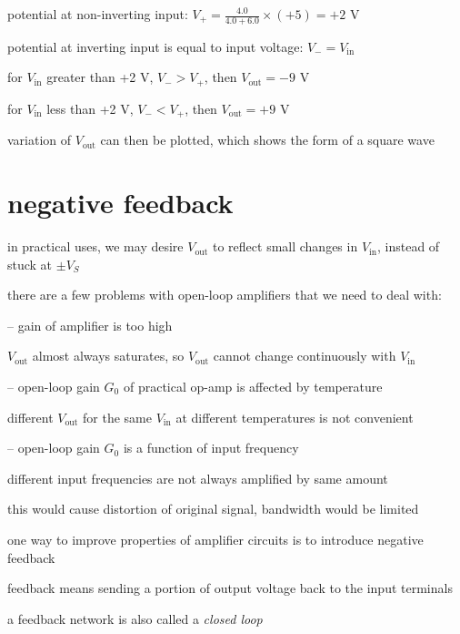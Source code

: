 \sol potential at non-inverting input: $V_+ = \frac{4.0}{4.0+6.0}\times(+5) = +2\text{ V}$

potential at inverting input is equal to input voltage: $V_-=V_\text{in}$

for $V_\text{in}$ greater than +2 V, $V_->V_+$, then $V_\text{out}=-9\text{ V}$

for $V_\text{in}$ less than +2 V, $V_-<V_+$, then $V_\text{out}=+9\text{ V}$

variation of $V_\text{out}$ can then be plotted, which shows the form of a square wave \eoe

\section{negative feedback}

in practical uses, we may desire $V_\text{out}$ to reflect small changes in $V_\text{in}$, instead of stuck at $\pm V_S$

there are a few problems with open-loop amplifiers that we need to deal with:

\begin{compactitem}
	\item[--] gain of amplifier is too high
	
	$V_\text{out}$ almost always saturates, so $V_\text{out}$ cannot change continuously with $V_\text{in}$
	
	\item[--] open-loop gain $G_0$ of practical op-amp is affected by temperature
	
	different $V_\text{out}$ for the same $V_\text{in}$ at different temperatures is not convenient
	
	\item[--] open-loop gain $G_0$ is a function of input frequency
	
	different input frequencies are not always amplified by same amount
	
	this would cause distortion of original signal, bandwidth would be limited
\end{compactitem}






one way to improve properties of amplifier circuits is to introduce negative feedback

feedback means sending a portion of output voltage back to the input terminals

a feedback network is also called a \emph{closed loop}


